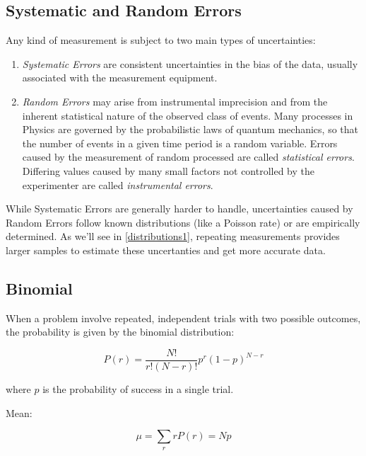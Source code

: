 \subsection{Systematic and Random Errors}

Any kind of measurement is subject to two main types of uncertainties:

\begin{enumerate}
	\item \textit{Systematic Errors} are consistent uncertainties in the bias of the data, usually associated with the measurement equipment.
	\item \textit{Random Errors} may arise from instrumental imprecision and from the inherent statistical nature of the observed class of events. Many processes in Physics are governed by the probabilistic laws of quantum mechanics, so that the number of events in a given time period is a random variable. Errors caused by the measurement of random processed are called \textit{statistical errors}. Differing values caused by many small factors not controlled by the experimenter are called \textit{instrumental errors}.
\end{enumerate}

While Systematic Errors are generally harder to handle, uncertainties caused by Random Errors follow known distributions (like a Poisson rate) or are empirically determined. As we'll see in \ref{distributions1}, repeating measurements provides larger samples to estimate these uncertanties and get more accurate data.


\subsection{Binomial}

When a problem involve repeated, independent trials with two possible outcomes, the probability is given by the binomial distribution:

\begin{equation}
	P(r)= \frac{N! }{ r! \left( N-r \right)! } p^r (1-p)^{N-r}
\end{equation}

where $p$ is the probability of success in a single trial.


Mean:

\begin{equation}
	\mu = \sum_{r}rP(r) = Np
\end{equation}

